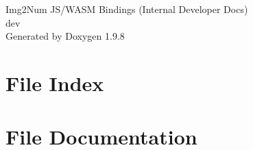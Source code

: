 \documentclass[twoside]{book}
\newcommand{\+}{\discretionary{\mbox{\scriptsize$\hookleftarrow$}}{}{}}
\newcommand{\clearemptydoublepage}{%
    \newpage{\pagestyle{empty}\cleardoublepage}%
  }
\begin{document}
  \raggedbottom
    \hypersetup{pageanchor=false,
                bookmarksnumbered=true,
                pdfencoding=unicode
               }
  \begin{titlepage}
  \vspace*{7cm}
  \begin{center}%
  {\Large Img2\+Num JS/\+WASM Bindings (\+Internal Developer Docs)}\\
  [1ex]\large dev \\
  \vspace*{1cm}
  {\large Generated by Doxygen 1.9.8}\\
  \end{center}
  \end{titlepage}
  \clearemptydoublepage
  \tableofcontents
  \clearemptydoublepage
  \hypersetup{pageanchor=true}

\chapter{File Index}

\chapter{File Documentation}

  \backmatter
  \newpage
  \clearemptydoublepage
  \printindex
\end{document}
